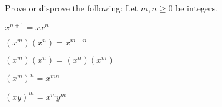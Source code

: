   Prove or disprove the following:
   Let $m,n \geq 0$ be integers.
   \begin{tightlist}
   \item $x^{n + 1} = x x^n$
   \item $(x^m)(x^n) = x^{m+n}$
   \item $(x^m)(x^n) = (x^n)(x^m)$
   \item $(x^m)^n = x^{mn}$
   \item $(xy)^m = x^m y^m$
   \end{tightlist}
